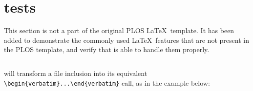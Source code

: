 \section*{ tests}

This section is not a part of the original PLOS \LaTeX~template.
It has been added to demonstrate the commonly used \LaTeX~features that are not present in the PLOS template, and verify that  is able to handle them properly.

\subsection*{}

 will transform a \verb|| file inclusion into its equivalent \verb|\begin{verbatim}...\end{verbatim}| call, as in the example below:


